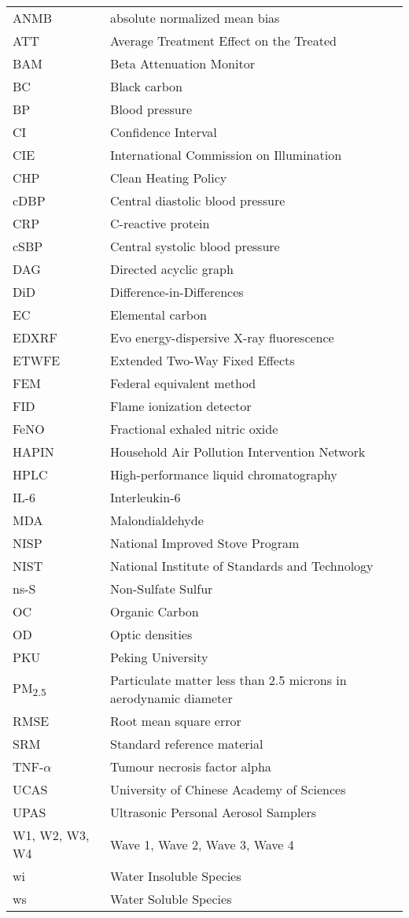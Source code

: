 \documentclass[
  letterpaper,
  DIV=11,
  numbers=noendperiod]{scrartcl}
\begin{document}
\begin{longtable}[]{@{}
  >{\raggedright\arraybackslash}p{}
  >{\raggedright\arraybackslash}p{}@{}}
\toprule\noalign{}
\endhead
\bottomrule\noalign{}
\endlastfoot
ANMB & absolute normalized mean bias \\
ATT & Average Treatment Effect on the Treated \\
BAM & Beta Attenuation Monitor \\
BC & Black carbon \\
BP & Blood pressure \\
CI & Confidence Interval \\
CIE & International Commission on Illumination \\
CHP & Clean Heating Policy \\
cDBP & Central diastolic blood pressure \\
CRP & C-reactive protein \\
cSBP & Central systolic blood pressure \\
DAG & Directed acyclic graph \\
DiD & Difference-in-Differences \\
EC & Elemental carbon \\
EDXRF & Evo energy-dispersive X-ray fluorescence \\
ETWFE & Extended Two-Way Fixed Effects \\
FEM & Federal equivalent method \\
FID & Flame ionization detector \\
FeNO & Fractional exhaled nitric oxide \\
HAPIN & Household Air Pollution Intervention Network \\
HPLC & High-performance liquid chromatography \\
IL-6 & Interleukin-6 \\
MDA & Malondialdehyde \\
NISP & National Improved Stove Program \\
NIST & National Institute of Standards and Technology \\
ns-S & Non-Sulfate Sulfur \\
OC & Organic Carbon \\
OD & Optic densities \\
PKU & Peking University \\
PM\textsubscript{2.5} & Particulate matter less than 2.5 microns in
aerodynamic diameter \\
RMSE & Root mean square error \\
SRM & Standard reference material \\
TNF-\(\alpha\) & Tumour necrosis factor alpha \\
UCAS & University of Chinese Academy of Sciences \\
UPAS & Ultrasonic Personal Aerosol Samplers \\
W1, W2, W3, W4 & Wave 1, Wave 2, Wave 3, Wave 4 \\
wi & Water Insoluble Species \\
ws & Water Soluble Species \\
\end{longtable}
\end{document}
